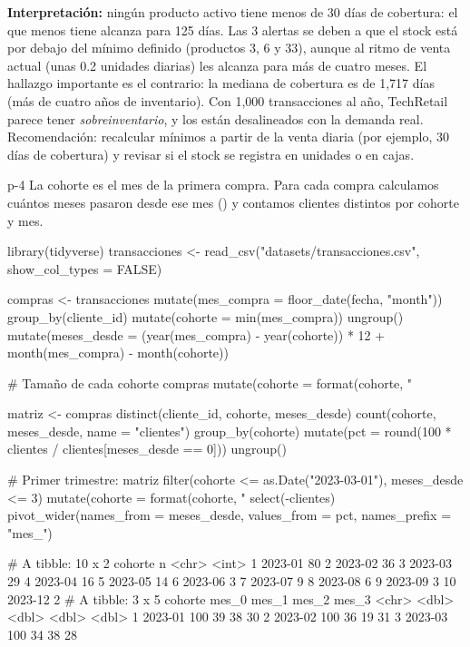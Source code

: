 \textbf{Interpretación:} ningún producto activo tiene menos de 30 días de
cobertura: el que menos tiene alcanza para 125 días. Las 3 alertas se deben
a que el stock está por debajo del mínimo definido (productos 3, 6 y 33),
aunque al ritmo de venta actual (unas 0.2 unidades diarias) les alcanza para más
de cuatro meses. El hallazgo importante es el contrario: la mediana de
cobertura es de 1,717 días (más de cuatro años de inventario). Con 1,000
transacciones al año, TechRetail parece tener \emph{sobreinventario}, y los
 están desalineados con la demanda real. Recomendación:
recalcular mínimos a partir de la venta diaria (por ejemplo, 30 días de
cobertura) y revisar si el stock se registra en unidades o en cajas.


\begin{solucion}{p-4}
La cohorte es el mes de la primera compra. Para cada compra calculamos
cuántos meses pasaron desde ese mes () y contamos
clientes distintos por cohorte y mes.
\end{solucion}

\begin{rcode}
library(tidyverse)
transacciones <- read_csv("datasets/transacciones.csv",
                          show_col_types = FALSE)

compras <- transacciones %
  mutate(mes_compra = floor_date(fecha, "month")) %
  group_by(cliente_id) %
  mutate(cohorte = min(mes_compra)) %
  ungroup() %
  mutate(meses_desde = (year(mes_compra) - year(cohorte)) * 12 +
                        month(mes_compra) - month(cohorte))

# Tamaño de cada cohorte
compras %
  mutate(cohorte = format(cohorte, "%

matriz <- compras %
  distinct(cliente_id, cohorte, meses_desde) %
  count(cohorte, meses_desde, name = "clientes") %
  group_by(cohorte) %
  mutate(pct = round(100 * clientes / clientes[meses_desde == 0])) %
  ungroup()

# Primer trimestre: %
matriz %
  filter(cohorte <= as.Date("2023-03-01"), meses_desde <= 3) %
  mutate(cohorte = format(cohorte, "%
  select(-clientes) %
  pivot_wider(names_from = meses_desde, values_from = pct,
              names_prefix = "mes_")
\end{rcode}

\begin{rsalida}
# A tibble: 10 x 2
   cohorte     n
   <chr>   <int>
 1 2023-01    80
 2 2023-02    36
 3 2023-03    29
 4 2023-04    16
 5 2023-05    14
 6 2023-06     3
 7 2023-07     9
 8 2023-08     6
 9 2023-09     3
10 2023-12     2
# A tibble: 3 x 5
  cohorte mes_0 mes_1 mes_2 mes_3
  <chr>   <dbl> <dbl> <dbl> <dbl>
1 2023-01   100    39    38    30
2 2023-02   100    36    19    31
3 2023-03   100    34    38    28
\end{rsalida}

